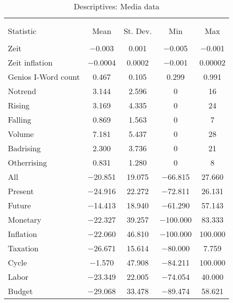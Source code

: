 \documentclass[10pt]{article}
\begin{document}
\begin{table}[!htbp]
\caption{Descriptives: Media data}


\centering{}\label{} %
\begin{tabular}{@{\extracolsep{5pt}}lcccc}
 &  &  &  & \tabularnewline
 &  &  &  & \tabularnewline
\hline 
Statistic  & \multicolumn{1}{c}{Mean} & \multicolumn{1}{c}{St. Dev.} & \multicolumn{1}{c}{Min} & \multicolumn{1}{c}{Max}\tabularnewline
 &  &  &  & \tabularnewline
Zeit  & $-$0.003  & 0.001  & $-$0.005  & $-$0.001 \tabularnewline
Zeit inflation   & $-$0.0004  & 0.0002  & $-$0.001  & 0.00002 \tabularnewline
Genios I-Word count  & 0.467  & 0.105  & 0.299  & 0.991 \tabularnewline
Notrend  & 3.144  & 2.596  & 0  & 16 \tabularnewline
Rising  & 3.169  & 4.335  & 0  & 24 \tabularnewline
Falling  & 0.869  & 1.563  & 0  & 7 \tabularnewline
Volume  & 7.181  & 5.437  & 0  & 28 \tabularnewline
Badrising  & 2.300  & 3.736  & 0  & 21 \tabularnewline
Otherrising  & 0.831  & 1.280  & 0  & 8 \tabularnewline
All  & $-$20.851  & 19.075  & $-$66.815  & 27.660 \tabularnewline
Present  & $-$24.916  & 22.272  & $-$72.811  & 26.131 \tabularnewline
Future  & $-$14.413  & 18.940  & $-$61.290  & 57.143 \tabularnewline
Monetary  & $-$22.327  & 39.257  & $-$100.000  & 83.333 \tabularnewline
Inflation  & $-$22.060  & 46.810  & $-$100.000  & 100.000 \tabularnewline
Taxation  & $-$26.671  & 15.614  & $-$80.000  & 7.759 \tabularnewline
Cycle  & $-$1.570  & 47.908  & $-$84.211  & 100.000 \tabularnewline
Labor  & $-$23.349  & 22.005  & $-$74.054  & 40.000 \tabularnewline
Budget  & $-$29.068  & 33.478  & $-$89.474  & 58.621 \tabularnewline
\hline 
\end{tabular}
\end{table}
\end{document}
